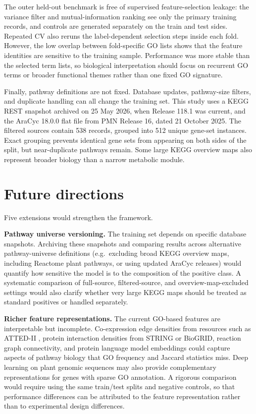 \documentclass[12pt,letterpaper,oneside,openany]{book}
\begin{document}
The outer held-out benchmark is free of supervised feature-selection leakage: the variance filter and mutual-information ranking see only the primary training records, and controls are generated separately on the train and test sides. Repeated CV also reruns the label-dependent selection steps inside each fold. However, the low overlap between fold-specific GO lists shows that the feature identities are sensitive to the training sample. Performance was more stable than the selected term lists, so biological interpretation should focus on recurrent GO terms or broader functional themes rather than one fixed GO signature.

Finally, pathway definitions are not fixed. Database updates, pathway-size filters, and duplicate handling can all change the training set. This study uses a KEGG REST snapshot archived on 25 May 2026, when Release 118.1 was current, and the AraCyc 18.0.0 flat file from PMN Release 16, dated 21 October 2025. The filtered sources contain 538 records, grouped into 512 unique gene-set instances. Exact grouping prevents identical gene sets from appearing on both sides of the split, but near-duplicate pathways remain. Some large KEGG overview maps also represent broader biology than a narrow metabolic module.

\section{Future directions}
\label{sec:disc_future_work}

Five extensions would strengthen the framework.

\textbf{Pathway universe versioning.} The training set depends on specific database snapshots. Archiving these snapshots and comparing results across alternative pathway-universe definitions (e.g.\ excluding broad KEGG overview maps, including Reactome plant pathways, or using updated AraCyc releases) would quantify how sensitive the model is to the composition of the positive class. A systematic comparison of full-source, filtered-source, and overview-map-excluded settings would also clarify whether very large KEGG maps should be treated as standard positives or handled separately.

\textbf{Richer feature representations.} The current GO-based features are interpretable but incomplete. Co-expression edge densities from resources such as ATTED-II \citep{obayashi2018atted}, protein interaction densities from STRING or BioGRID, reaction graph connectivity, and protein language model embeddings \citep{lin2023evolutionary} could capture aspects of pathway biology that GO frequency and Jaccard statistics miss. Deep learning on plant genomic sequences may also provide complementary representations for genes with sparse GO annotation. A rigorous comparison would require using the same train/test splits and negative controls, so that performance differences can be attributed to the feature representation rather than to experimental design differences.
\end{document}
